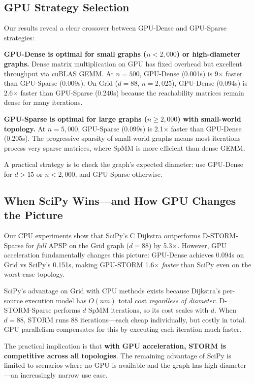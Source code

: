\documentclass[journal]{IEEEtran}
\begin{document}
\subsection{GPU Strategy Selection}

Our results reveal a clear crossover between GPU-Dense and GPU-Sparse strategies:

\textbf{GPU-Dense is optimal for small graphs ($n < 2{,}000$) or high-diameter graphs.} Dense matrix multiplication on GPU has fixed overhead but excellent throughput via cuBLAS GEMM. At $n=500$, GPU-Dense (0.001s) is 9$\times$ faster than GPU-Sparse (0.009s). On Grid ($d=88$, $n=2{,}025$), GPU-Dense (0.094s) is 2.6$\times$ faster than GPU-Sparse (0.240s) because the reachability matrices remain dense for many iterations.

\textbf{GPU-Sparse is optimal for large graphs ($n \geq 2{,}000$) with small-world topology.} At $n=5{,}000$, GPU-Sparse (0.099s) is 2.1$\times$ faster than GPU-Dense (0.205s). The progressive sparsity of small-world graphs means most iterations process very sparse matrices, where SpMM is more efficient than dense GEMM.

A practical strategy is to check the graph's expected diameter: use GPU-Dense for $d > 15$ or $n < 2{,}000$, and GPU-Sparse otherwise.

\subsection{When SciPy Wins---and How GPU Changes the Picture}

Our CPU experiments show that SciPy's C Dijkstra outperforms D-STORM-Sparse for \emph{full} APSP on the Grid graph ($d=88$) by 5.3$\times$. However, GPU acceleration fundamentally changes this picture: GPU-Dense achieves 0.094s on Grid vs SciPy's 0.151s, making GPU-STORM 1.6$\times$ \emph{faster} than SciPy even on the worst-case topology.

SciPy's advantage on Grid with CPU methods exists because Dijkstra's per-source execution model has $O(nm)$ total cost \emph{regardless of diameter}. D-STORM-Sparse performs $d$ SpMM iterations, so its cost scales with $d$. When $d=88$, STORM runs 88 iterations---each cheap individually, but costly in total. GPU parallelism compensates for this by executing each iteration much faster.

The practical implication is that \textbf{with GPU acceleration, STORM is competitive across all topologies}. The remaining advantage of SciPy is limited to scenarios where no GPU is available and the graph has high diameter---an increasingly narrow use case.
\end{document}
